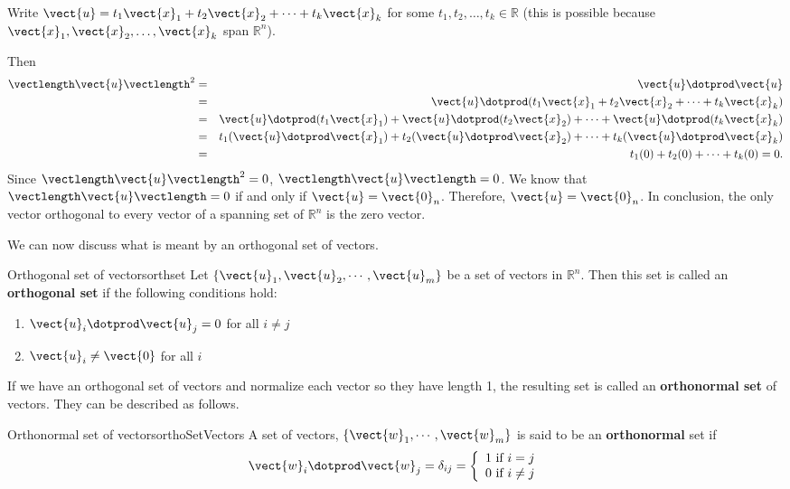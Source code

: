 \begin{solution}
Write $\vect{u}=t_1\vect{x}_1 + t_2\vect{x}_2 +\cdots +t_k\vect{x}_k$
for some $t_1, t_2, \ldots, t_k\in\mathbb{R}$
(this is possible because
$\vect{x}_1, \vect{x}_2, \ldots, \vect{x}_k$ span $\mathbb{R}^n$).
 
Then
\begin{eqnarray*}
\vectlength\vect{u}\vectlength^2 & = & \vect{u}\dotprod\vect{u} \\
& = & \vect{u}\dotprod(t_1\vect{x}_1 + t_2\vect{x}_2 +\cdots +t_k\vect{x}_k) \\
& = & \vect{u}\dotprod (t_1\vect{x}_1) +  \vect{u}\dotprod (t_2\vect{x}_2) +
\cdots +  \vect{u}\dotprod (t_k\vect{x}_k) \\
& = & t_1(\vect{u}\dotprod \vect{x}_1) + t_2(\vect{u}\dotprod \vect{x}_2) + \cdots 
+ t_k(\vect{u}\dotprod \vect{x}_k) \\
& = & t_1(0) + t_2(0) + \cdots + t_k(0) = 0.
\end{eqnarray*}
Since $\vectlength\vect{u}\vectlength^2 =0$, $\vectlength\vect{u}\vectlength =0$.
We know that $\vectlength\vect{u}\vectlength=0$ if and only if 
$\vect{u}=\vect{0}_n$.
Therefore, $\vect{u}=\vect{0}_n$.
In conclusion, the only vector orthogonal to every vector of
a spanning set of $\mathbb{R}^n$ is the zero vector.
\end{solution}

We can now discuss what is meant by an orthogonal set of vectors. 

\begin{definition}{Orthogonal set of vectors}{orthset}
Let $\{ \vect{u}_1, \vect{u}_2, \cdots, \vect{u}_m \}$ be a set of
vectors in $\mathbb{R}^n$. Then this set is called an
\textbf{orthogonal set}
if the following conditions hold:
\begin{enumerate}
\item 
$\vect{u}_i \dotprod \vect{u}_j = 0$ for all $i \neq j$ 
\item
$\vect{u}_i \neq \vect{0}$ for all $i$
\end{enumerate}
\end{definition}

If we have an orthogonal set of vectors and normalize each vector so
they have length 1, the resulting set is called an \textbf{orthonormal
set} of vectors. They can be described as follows.

\begin{definition}{Orthonormal set of vectors}{orthoSetVectors}
A set of vectors, $\left\{ \vect{w}_{1},\cdots ,\vect{w}_{m}\right\} $
is said to be an
\textbf{orthonormal}
set if 
\[
\vect{w}_i \dotprod \vect{w}_j = \delta _{ij} = \left\{ 
\begin{array}{c}
1\text{ if }i=j \\ 
0\text{ if }i\neq j
\end{array}
\right.
\]
\end{definition}

